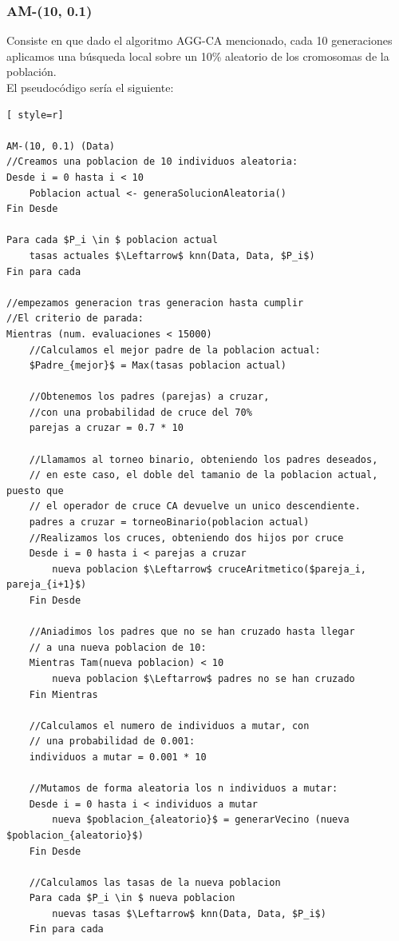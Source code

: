 \subsubsection{AM-(10, 0.1)}
Consiste en que dado el algoritmo AGG-CA mencionado, cada 10 generaciones aplicamos una búsqueda local sobre un 10\% aleatorio de los cromosomas de la población.\\ 
El pseudocódigo sería el siguiente:



\begin{lstlisting}[ style=r]

AM-(10, 0.1) (Data)
//Creamos una poblacion de 10 individuos aleatoria:
Desde i = 0 hasta i < 10
	Poblacion actual <- generaSolucionAleatoria()
Fin Desde

Para cada $P_i \in $ poblacion actual
	tasas actuales $\Leftarrow$ knn(Data, Data, $P_i$)
Fin para cada

//empezamos generacion tras generacion hasta cumplir
//El criterio de parada:
Mientras (num. evaluaciones < 15000)
	//Calculamos el mejor padre de la poblacion actual:
	$Padre_{mejor}$ = Max(tasas poblacion actual)
	
	//Obtenemos los padres (parejas) a cruzar, 
	//con una probabilidad de cruce del 70%
	parejas a cruzar = 0.7 * 10
	
	//Llamamos al torneo binario, obteniendo los padres deseados, 
	// en este caso, el doble del tamanio de la poblacion actual, puesto que 
	// el operador de cruce CA devuelve un unico descendiente.
	padres a cruzar = torneoBinario(poblacion actual)
	//Realizamos los cruces, obteniendo dos hijos por cruce
	Desde i = 0 hasta i < parejas a cruzar
		nueva poblacion $\Leftarrow$ cruceAritmetico($pareja_i, pareja_{i+1}$)
	Fin Desde
	
	//Aniadimos los padres que no se han cruzado hasta llegar 
	// a una nueva poblacion de 10:
	Mientras Tam(nueva poblacion) < 10
		nueva poblacion $\Leftarrow$ padres no se han cruzado
	Fin Mientras
	
	//Calculamos el numero de individuos a mutar, con
	// una probabilidad de 0.001:
	individuos a mutar = 0.001 * 10
	
	//Mutamos de forma aleatoria los n individuos a mutar:
	Desde i = 0 hasta i < individuos a mutar
		nueva $poblacion_{aleatorio}$ = generarVecino (nueva $poblacion_{aleatorio}$)
	Fin Desde
	
	//Calculamos las tasas de la nueva poblacion
	Para cada $P_i \in $ nueva poblacion
		nuevas tasas $\Leftarrow$ knn(Data, Data, $P_i$)
	Fin para cada
	

\end{lstlisting}
